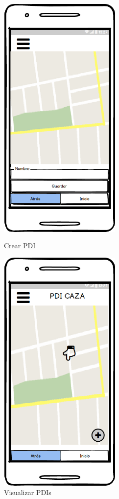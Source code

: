 	\begin{figure}[H]
\begin{minipage}[b]{0.5\linewidth} %
\centering
\includegraphics[width=6cm]{maqueta/pdi1.png}
 
\caption{Crear PDI}
\label{fig:pdi1}
\end{minipage}
\hspace{0.5cm} %
\begin{minipage}[b]{0.5\linewidth}
\centering
\includegraphics[width=6cm]{maqueta/pdi2.png}

\caption{Visualizar PDIs}
\label{fig:pdi2}
\end{minipage}
\end{figure}
	
